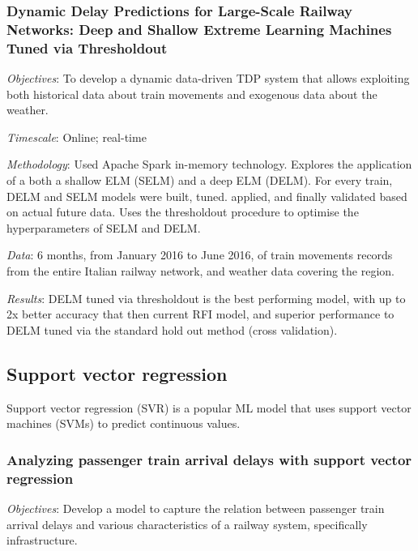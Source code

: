 \documentclass{article}
\begin{document}
\subsubsection{Dynamic Delay Predictions for Large-Scale Railway Networks: Deep and Shallow Extreme Learning Machines Tuned via Thresholdout \cite{oneto_et_al_2017b}}

\textit{Objectives}: To develop a dynamic data-driven TDP system that allows exploiting both historical data about train movements and exogenous data about the weather. 

\smallskip

\textit{Timescale}: Online; real-time

\smallskip

\textit{Methodology}: Used Apache Spark in-memory technology. Explores the application of a both a shallow ELM (SELM) and a deep ELM (DELM). For every train, DELM and SELM models were built, tuned. applied, and finally validated based on actual future data. Uses the thresholdout procedure to optimise the hyperparameters of SELM and DELM.

\smallskip

\textit{Data}: 6 months, from January 2016 to June 2016, of train movements records from the entire Italian railway network, and weather data covering the region. 

\smallskip

\textit{Results}: DELM tuned via thresholdout is the best performing model, with up to 2x better accuracy that then current RFI model, and superior performance to DELM tuned via the standard hold out method (cross validation). 

\subsection{Support vector regression}

Support vector regression (SVR) is a popular ML model that uses support vector machines (SVMs) to predict continuous values. 

\subsubsection{Analyzing passenger train arrival delays with support vector regression \cite{markovic_et_al_2015}}

\textit{Objectives}: Develop a model to capture the relation between passenger train arrival delays and various characteristics of a railway system, specifically infrastructure.
\end{document}
